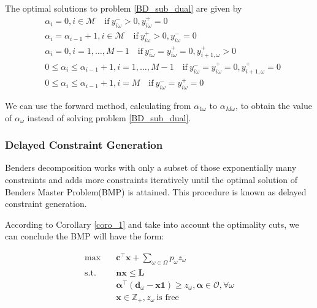\begin{prop}\label{optimal_sol_sub_dual}
  The optimal solutions to problem \eqref{BD_sub_dual} are given by 
\begin{equation}\label{BD_sub_simplified}
  \begin{aligned}
    & \alpha_{i} = 0, i \in \mathcal{M} \quad \text{if}~  y_{i \omega}^{-} > 0,  y_{i \omega}^{+} = 0   \\
    & \alpha_{i} = \alpha_{i-1}+1, i \in \mathcal{M} \quad \text{if}~ y_{i \omega}^{+} > 0,  y_{i \omega}^{-} = 0 \\
    & \alpha_{i} = 0, i =1,\ldots, M-1 \quad \text{if}~ y_{i \omega}^{-} = y_{i \omega}^{+} = 0, y_{i+1, \omega}^{+}> 0 \\
    & 0 \leq \alpha_{i} \leq \alpha_{i-1}+1, i =1,\ldots, M-1 \quad \text{if}~ y_{i \omega}^{-} = y_{i \omega}^{+} = 0, y_{i+1, \omega}^{+}= 0 \\
    & 0 \leq \alpha_{i} \leq \alpha_{i-1}+1, i = M \quad \text{if}~ y_{i \omega}^{-} = y_{i \omega}^{+} = 0
  \end{aligned}
\end{equation}
\end{prop}


We can use the forward method, calculating from $\alpha_{1 \omega}$ to $\alpha_{M \omega}$, to obtain the value of $\alpha_{\omega}$ instead of solving problem \eqref{BD_sub_dual}.

\subsubsection{Delayed Constraint Generation}\label{bender_stage}
Benders decomposition works with only a subset of those exponentially many constraints and adds more constraints iteratively until the optimal solution of Benders Master Problem(BMP) is attained. This procedure is known as delayed constraint generation.

According to Corollary \ref{coro_1} and take into account the optimality cuts, we can conclude the BMP will have the form:

\begin{equation}\label{BD_master2}
  \begin{aligned}
    \max \quad & \mathbf{c}^{\intercal} \mathbf{x} + \sum_{\omega \in \Omega} p_{\omega} z_{\omega} \\
    \text {s.t.} \quad & \mathbf{n} \mathbf{x} \leq \mathbf{L} \\
    & \bm{\alpha}^{\intercal}(\mathbf{d}_{\omega}- \mathbf{x} \mathbf{1}) \geq z_{\omega}, \bm{\alpha} \in \mathcal{O}, \forall \omega \\
     & \mathbf{x} \in \mathbb{Z}_{+}, z_{\omega} ~\text{is free}
  \end{aligned}
\end{equation}

